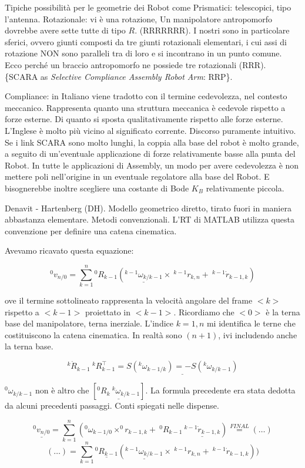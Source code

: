 Tipiche possibilità per le geometrie dei Robot come Prismatici: telescopici, tipo l'antenna. Rotazionale: vi è una rotazione, Un manipolatore antropomorfo dovrebbe avere sette tutte di tipo $R$. (RRRRRRR). I nostri sono in particolare sferici, ovvero giunti composti da tre giunti rotazionali elementari, i cui assi di rotazione NON sono paralleli tra di loro e si incontrano in un punto comune. Ecco perché un braccio antropomorfo ne possiede tre rotazionali (RRR). \{SCARA as \emph{Selective Compliance Assembly Robot Arm}: RRP\}.

Compliance: in Italiano viene tradotto con il termine cedevolezza, nel contesto meccanico. Rappresenta quanto una struttura meccanica è cedevole rispetto a forze esterne. Di quanto si sposta qualitativamente rispetto alle forze esterne. L'Inglese è molto più vicino al significato corrente. Discorso puramente intuitivo. Se i link SCARA sono molto lunghi, la coppia alla base del robot è molto grande, a seguito di un'eventuale applicazione di forze relativamente basse alla punta del Robot. In tutte le applicazioni di Assembly, un modo per avere cedevolezza è non mettere poli nell'origine in un eventuale regolatore alla base del Robot. E bisognerebbe inoltre scegliere una costante di Bode $K_B$ relativamente piccola.

Denavit - Hartenberg (DH). Modello geometrico diretto, tirato fuori in maniera abbastanza elementare. Metodi convenzionali. L'RT di MATLAB utilizza questa convenzione per definire una catena cinematica.

Avevamo ricavato questa equazione:

\[
	^0v_{n/0} = \sum_{k=1}^n{^0R_{k-1}(\underline{^{k-1}\omega_{k/k-1}}\times\ ^{k-1}r_{k,n} +\ ^{k-1}\dot{r}_{k-1,k})}
\]

ove il termine sottolineato rappresenta la velocità angolare del frame $<k>$ rispetto a $<k-1>$ proiettato in $<k-1>$. Ricordiamo che $<0>$ è la terna base del manipolatore, terna inerziale. L'indice $k=1,n$ mi identifica le terne che costituiscono la catena cinematica. In realtà sono $(n+1)$, ivi includendo anche la terna base.

\[
	^k\dot{R}_{k-1}\ ^kR_{k-1}^\top = \underline{S(^k\omega_{k-1/k}) = -S(^k\omega_{k/k-1})}
\]

$^0\omega_{k/k-1}$ non è altro che $[\underline{^0R_k\ ^k\omega_{k/k-1}}]$. La formula precedente era stata dedotta da alcuni precedenti passaggi. Conti spiegati nelle dispense.

\[
	\underline{^0v_{n/0}} = \sum_{k=1}^n{(^0\omega_{k-1/0}\times ^0r_{k-1,k} +\ ^0R_{k-1}\ \underline{^{k-1}\dot{r}_{k-1,k}})} \stackrel{FINAL}{=} (\dots)
\]
\[
	(\dots) = \sum_{k=1}^n{\underline{^0R_{k-1}}(\underline{^{k-1}\omega_{k/k-1}}\times\ ^{k-1}r_{k,n} +\ ^{k-1}\dot{r}_{k-1,k}))}
\]

